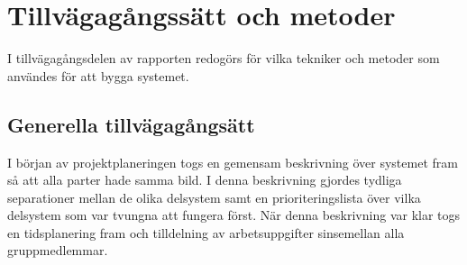 \documentclass[swedish, a4paper,12pt]{article}
\begin{document}



\section{Tillvägagångssätt och metoder}




I tillvägagångsdelen av rapporten redogörs för vilka tekniker och metoder som användes för att bygga systemet.

\subsection{Generella tillvägagångsätt}
I början av projektplaneringen togs en gemensam beskrivning över systemet fram så att alla parter hade samma bild. I denna beskrivning gjordes tydliga separationer mellan de olika delsystem samt en prioriteringslista över vilka delsystem som var tvungna att fungera först. När denna beskrivning var klar togs en tidsplanering fram och tilldelning av arbetsuppgifter sinsemellan alla gruppmedlemmar.
\end{document}

